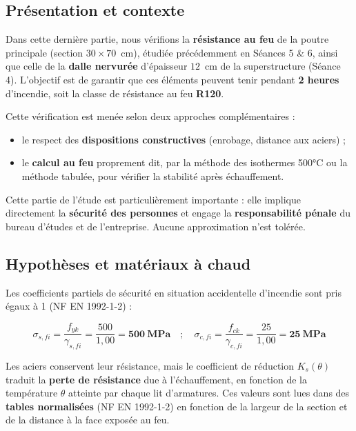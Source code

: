 
\subsection{Présentation et contexte}

Dans cette dernière partie, nous vérifions la \textbf{résistance au feu} de la poutre principale (section $30 \times 70$~cm), étudiée précédemment en Séances 5 \& 6, ainsi que celle de la \textbf{dalle nervurée} d'épaisseur $12$~cm de la superstructure (Séance 4). L'objectif est de garantir que ces éléments peuvent tenir pendant \textbf{2 heures} d'incendie, soit la classe de résistance au feu \textbf{R120}.

Cette vérification est menée selon deux approches complémentaires :
\begin{itemize}
  \item le respect des \textbf{dispositions constructives} (enrobage, distance aux aciers) ;
  \item le \textbf{calcul au feu} proprement dit, par la méthode des isothermes 500°C ou la méthode tabulée, pour vérifier la stabilité après échauffement.
\end{itemize}

Cette partie de l'étude est particulièrement importante : elle implique directement la \textbf{sécurité des personnes} et engage la \textbf{responsabilité pénale} du bureau d'études et de l'entreprise. Aucune approximation n'est tolérée.

\subsection{Hypothèses et matériaux à chaud}

Les coefficients partiels de sécurité en situation accidentelle d'incendie sont pris égaux à 1 (NF EN 1992-1-2) :

\[
\sigma_{s,fi} = \frac{f_{yk}}{\gamma_{s,fi}} = \frac{500}{1{,}00} = \mathbf{500~\text{MPa}}
\quad ; \quad
\sigma_{c,fi} = \frac{f_{ck}}{\gamma_{c,fi}} = \frac{25}{1{,}00} = \mathbf{25~\text{MPa}}
\]

Les aciers conservent leur résistance, mais le coefficient de réduction $K_s(\theta)$ traduit la \textbf{perte de résistance} due à l'échauffement, en fonction de la température $\theta$ atteinte par chaque lit d'armatures. Ces valeurs sont lues dans des \textbf{tables normalisées} (NF EN 1992-1-2) en fonction de la largeur de la section et de la distance à la face exposée au feu.

